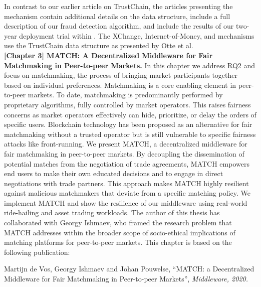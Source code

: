 In contrast to our earlier article on TrustChain, the articles presenting the \TrustChain{} mechanism contain additional details on the data structure, include a full description of our fraud detection algorithm, and include the results of our two-year deployment trial within \Tribler{}.
The XChange, Internet-of-Money, and \Dappcoder{} mechanisms use the TrustChain data structure as presented by Otte et al.\\

\textbf{[Chapter 3] MATCH: A Decentralized Middleware for Fair Matchmaking in Peer-to-peer Markets.}
In this chapter we address RQ2 and focus on matchmaking, the process of bringing market participants together based on individual preferences.
Matchmaking is a core enabling element in peer-to-peer markets.
To date, matchmaking is predominantly performed by proprietary algorithms, fully controlled by market operators.
This raises fairness concerns as market operators effectively can hide, prioritize, or delay the orders of specific users.
Blockchain technology has been proposed as an alternative for fair matchmaking without a trusted operator but is still vulnerable to specific fairness attacks like front-running.
We present MATCH, a decentralized middleware for fair matchmaking in peer-to-peer markets.
By decoupling the dissemination of potential matches from the negotiation of trade agreements, MATCH empowers end users to make their own educated decisions and to engage in direct negotiations with trade partners.
This approach makes MATCH highly resilient against malicious matchmakers that deviate from a specific matching policy.
We implement MATCH and show the resilience of our middleware using real-world ride-hailing and asset trading workloads.
The author of this thesis has collaborated with Georgy Ishmaev, who framed the research problem that MATCH addresses within the broader scope of socio-ethical implications of matching platforms for peer-to-peer markets.
This chapter is based on the following publication:

Martijn de Vos, Georgy Ishmaev and Johan Pouwelse, \enquote{MATCH: a Decentralized Middleware for Fair Matchmaking in Peer-to-peer Markets}, \emph{Middleware, 2020.}\\

